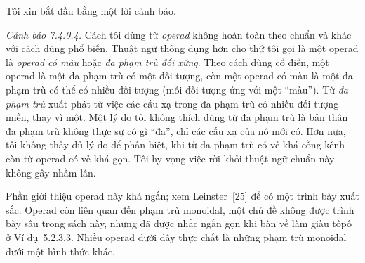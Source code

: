 Tôi xin bắt đầu bằng một lời cảnh báo.

\noindent\textit{Cảnh báo 7.4.0.4.}\keepwithnext
Cách tôi dùng từ \emph{operad} không hoàn toàn theo chuẩn và khác với cách dùng phổ biến. Thuật ngữ thông dụng hơn cho thứ tôi gọi là một operad là \emph{operad có màu} hoặc \emph{đa phạm trù đối xứng}. Theo cách dùng cổ điển, một operad là một đa phạm trù có một đối tượng, còn một operad có màu là một đa phạm trù có thể có nhiều đối tượng (mỗi đối tượng ứng với một ``màu''). Từ \emph{đa phạm trù} xuất phát từ việc các cấu xạ trong đa phạm trù có nhiều đối tượng miền, thay vì một. Một lý do tôi không thích dùng từ đa phạm trù là bản thân đa phạm trù không thực sự có gì ``đa'', chỉ các cấu xạ của nó mới có. Hơn nữa, tôi không thấy đủ lý do để phân biệt, khi từ đa phạm trù có vẻ khá cồng kềnh còn từ operad có vẻ khá gọn. Tôi hy vọng việc rời khỏi thuật ngữ chuẩn này không gây nhầm lẫn.

Phần giới thiệu operad này khá ngắn; xem Leinster~[25] để có một trình bày xuất sắc. Operad còn liên quan đến phạm trù monoidal, một chủ đề không được trình bày sâu trong sách này, nhưng đã được nhắc ngắn gọn khi bàn về làm giàu tôpô ở Ví dụ~5.2.3.3. Nhiều operad dưới đây thực chất là những phạm trù monoidal dưới một hình thức khác.

